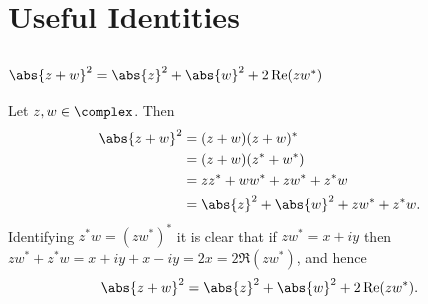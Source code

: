 \chapter{Useful Identities}\label{app:useful identities}
        \section{\texorpdfstring{\(\abs{z + w}^2 = \abs{z}^2 + \abs{w}^2 + 2\Re(zw^*)\)}{|z+w|2 = |z|2 + |w|2 + 2Re(zw*)}}
        Let \(z, w \in \complex\). Then
        \begin{align}
            \abs{z + w}^2 &= (z + w)(z + w)^*\\
            &= (z + w)(z^* + w^*)\\
            &= zz^* + ww^* + zw^* + z^*w\\
            &= \abs{z}^2 + \abs{w}^2 + zw^* + z^*w.
        \end{align}
        Identifying \(z^*w = (zw^*)^*\) it is clear that if \(zw^* = x + iy\) then \(zw^* + z^*w = x + iy + x - iy = 2x = 2\Re(zw^*)\), and hence
        \begin{equation}
            \abs{z + w}^2 = \abs{z}^2 + \abs{w}^2 + 2\Re(zw^*).
        \end{equation}
